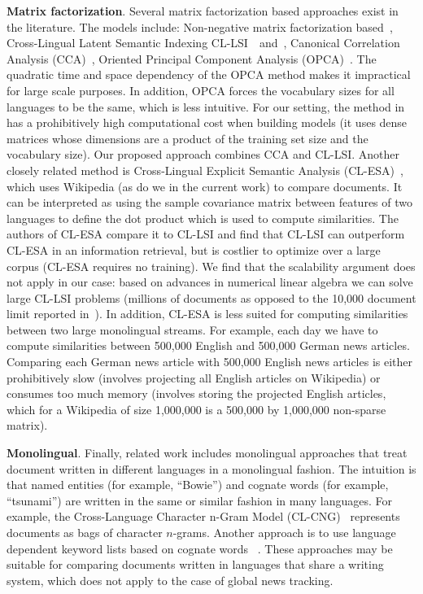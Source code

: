 \textbf{Matrix factorization}. Several matrix factorization based approaches exist in the literature. The models include: Non-negative matrix factorization based~\cite{nonnegfactor_lsi}, Cross-Lingual Latent Semantic Indexing CL-LSI~\cite{cl_lsi}~and~\cite{multilingualBook}, Canonical Correlation Analysis (CCA)~\cite{Hotelling}, Oriented Principal Component Analysis (OPCA)~\cite{platt2010translingual}. The quadratic time and space dependency of the OPCA method makes it impractical for large scale purposes. In addition, OPCA forces the vocabulary sizes for all languages to be the same, which is less intuitive. For our setting, the method in ~\cite{nonnegfactor_lsi} has a prohibitively high computational cost when building models (it uses dense matrices whose dimensions are a product of the training set size and the vocabulary size). Our proposed approach combines CCA and CL-LSI. Another closely related method is Cross-Lingual Explicit Semantic Analysis (CL-ESA)~\cite{ESA}, which uses Wikipedia (as do we in the current work) to compare documents. It can be interpreted as using the sample covariance matrix between features of two languages to define the dot product which is used to compute similarities.
The authors of CL-ESA compare it to CL-LSI and find that CL-LSI can outperform CL-ESA in an information retrieval, but is costlier to optimize over a large corpus (CL-ESA requires no training). We find that the scalability argument does not apply in our case: based on advances in numerical linear algebra we can solve large CL-LSI problems (millions of documents as opposed to the 10,000 document limit reported in~\cite{ESA}). In addition, CL-ESA is less suited for computing similarities between two large monolingual streams. For example, each day we have to compute similarities between 500,000 English and 500,000 German news articles. Comparing each German news article with 500,000 English news articles is either prohibitively slow (involves projecting all English articles on Wikipedia) or consumes too much memory (involves storing the projected English articles, which for a Wikipedia of size 1,000,000 is a 500,000 by 1,000,000 non-sparse matrix).

\textbf{Monolingual}. Finally, related work includes monolingual approaches that treat document written in different languages in a monolingual fashion. The intuition is that named entities (for example, ``Bowie'') and cognate words (for example, ``tsunami'') are written in the same or similar fashion in many languages. For example, the Cross-Language Character n-Gram Model (CL-CNG)~\cite{plagiarism} represents documents as bags of character $n$-grams. Another approach is to use language dependent keyword lists based on cognate words ~\cite{pouliquen2008story}. These approaches may be suitable for comparing documents written in languages that share a writing system, which does not apply to the case of global news tracking.



